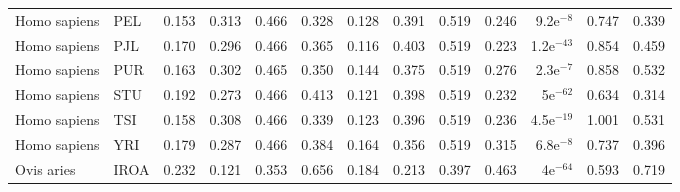\begin{longtable}{llrrrrrrrrrrr}
        Homo sapiens &                       PEL &                              0.153 &                               0.313 &                 0.466 &                 0.328 &                              0.128 &                               0.391 &                 0.519 &                 0.246 &   9.2e$^{-8}$ &  0.747 &  0.339 \\
        Homo sapiens &                       PJL &                              0.170 &                               0.296 &                 0.466 &                 0.365 &                              0.116 &                               0.403 &                 0.519 &                 0.223 &  1.2e$^{-43}$ &  0.854 &  0.459 \\
        Homo sapiens &                       PUR &                              0.163 &                               0.302 &                 0.465 &                 0.350 &                              0.144 &                               0.375 &                 0.519 &                 0.276 &   2.3e$^{-7}$ &  0.858 &  0.532 \\
        Homo sapiens &                       STU &                              0.192 &                               0.273 &                 0.466 &                 0.413 &                              0.121 &                               0.398 &                 0.519 &                 0.232 &    5e$^{-62}$ &  0.634 &  0.314 \\
        Homo sapiens &                       TSI &                              0.158 &                               0.308 &                 0.466 &                 0.339 &                              0.123 &                               0.396 &                 0.519 &                 0.236 &  4.5e$^{-19}$ &  1.001 &  0.531 \\
        Homo sapiens &                       YRI &                              0.179 &                               0.287 &                 0.466 &                 0.384 &                              0.164 &                               0.356 &                 0.519 &                 0.315 &   6.8e$^{-8}$ &  0.737 &  0.396 \\
          Ovis aries &                      IROA &                              0.232 &                               0.121 &                 0.353 &                 0.656 &                              0.184 &                               0.213 &                 0.397 &                 0.463 &    4e$^{-64}$ &  0.593 &  0.719 \\

\end{longtable}
